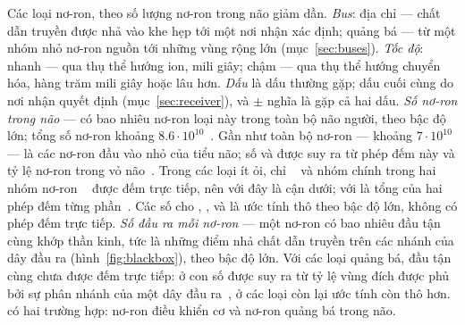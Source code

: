 \begin{table}[t]
\caption{Các loại nơ-ron, theo số lượng nơ-ron trong não giảm dần. \emph{Bus}: địa chỉ --- chất dẫn truyền được nhả vào khe hẹp tới một nơi nhận xác định; quảng bá --- từ một nhóm nhỏ nơ-ron nguồn tới những vùng rộng lớn (mục~\ref{sec:buses}). \emph{Tốc độ}: nhanh --- qua thụ thể hướng ion, mili giây; chậm --- qua thụ thể hướng chuyển hóa, hàng trăm mili giây hoặc lâu hơn. \emph{Dấu} là dấu thường gặp; dấu cuối cùng do nơi nhận quyết định (mục~\ref{sec:receiver}), và $\pm$ nghĩa là gặp cả hai dấu. \emph{Số nơ-ron trong não} --- có bao nhiêu nơ-ron loại này trong toàn bộ não người, theo bậc độ lớn; tổng số nơ-ron khoảng $8.6\cdot10^{10}$~\cite{Azevedo2009}. Gần như toàn bộ nơ-ron  --- khoảng $7\cdot10^{10}$ --- là các nơ-ron đầu vào nhỏ của tiểu não; số  và  được suy ra từ phép đếm này và tỷ lệ nơ-ron  trong vỏ não~\cite{Hendry1987}. Trong các loại ít ỏi, chỉ ~\cite{Airaksinen1991} và nhóm chính trong hai nhóm nơ-ron ~\cite{Pakkenberg1991} được đếm trực tiếp, nên với  đây là cận dưới; với  là tổng của hai phép đếm từng phần~\cite{Baker1990,Baker1991}. Các số cho , ,  và  là ước tính thô theo bậc độ lớn, không có phép đếm trực tiếp. \emph{Số đầu ra mỗi nơ-ron} --- một nơ-ron có bao nhiêu đầu tận cùng khớp thần kinh, tức là những điểm nhả chất dẫn truyền trên các nhánh của dây đầu ra (hình~\ref{fig:blackbox}), theo bậc độ lớn. Với các loại quảng bá, đầu tận cùng chưa được đếm trực tiếp: ở  con số được suy ra từ tỷ lệ vùng đích được phủ bởi sự phân nhánh của một dây đầu ra~\cite{Matsuda2009}, ở các loại còn lại ước tính còn thô hơn.  có hai trường hợp: nơ-ron điều khiển cơ và nơ-ron quảng bá trong não.}
\label{tab:types}
\end{table}

